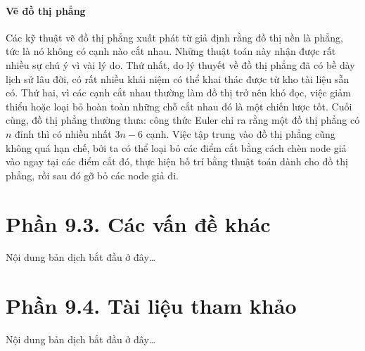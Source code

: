 \documentclass[12pt,a4paper, openany]{book}
\begin{document}
\subsubsection{Vẽ đồ thị phẳng}

Các kỹ thuật vẽ đồ thị phẳng xuất phát từ giả định rằng đồ thị nền là phẳng, tức là nó không có cạnh nào cắt nhau. Những thuật toán này nhận được rất nhiều sự chú ý vì vài lý do. Thứ nhất, do lý thuyết về đồ thị phẳng đã có bề dày lịch sử lâu đời, có rất nhiều khái niệm có thể khai thác được từ kho tài liệu sẵn có. Thứ hai, vì các cạnh cắt nhau thường làm đồ thị trở nên khó đọc, việc giảm thiểu hoặc loại bỏ hoàn toàn những chỗ cắt nhau đó là một chiến lược tốt. Cuối cùng, đồ thị phẳng thường thưa: công thức Euler chỉ ra rằng một đồ thị phẳng có $n$ đỉnh thì có nhiều nhất $3n − 6$ cạnh. Việc tập trung vào đồ thị phẳng cũng không quá hạn chế, bởi ta có thể loại bỏ các điểm cắt bằng cách chèn node giả vào ngay tại các điểm cắt đó, thực hiện bố trí bằng thuật toán dành cho đồ thị phẳng, rồi sau đó gỡ bỏ các node giả đi.

\chapter*{Phần 9.3. \newline Các vấn đề khác}

Nội dung bản dịch bắt đầu ở đây\dots

\chapter*{Phần 9.4. \newline Tài liệu tham khảo}

Nội dung bản dịch bắt đầu ở đây\dots
\end{document}
